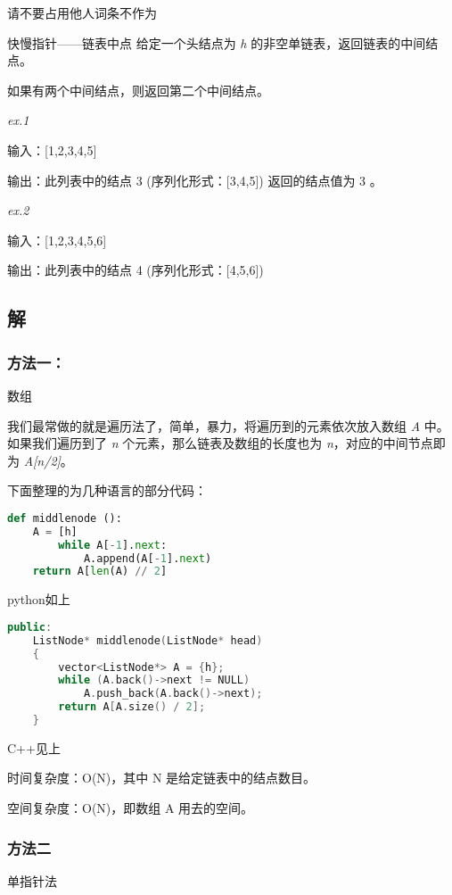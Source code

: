
\begin{issues}
\issueDraft 请不要占用他人词条不作为
\end{issues}

\begin{example}{快慢指针——链表中点}
给定一个头结点为 \textsl{h} 的非空单链表，返回链表的中间结点。

如果有两个中间结点，则返回第二个中间结点。

\textsl{ex.1}

输入：[1,2,3,4,5] 

输出：此列表中的结点 3 (序列化形式：[3,4,5])
返回的结点值为 3 。

\textsl{ex.2}

输入：[1,2,3,4,5,6]

输出：此列表中的结点 4 (序列化形式：[4,5,6])
\end{example}

\subsection{解}
\subsubsection{方法一：}
数组

我们最常做的就是遍历法了，简单，暴力，将遍历到的元素依次放入数组 \textsl{A }中。如果我们遍历到了 \textsl{n }个元素，那么链表及数组的长度也为 \textsl{n}，对应的中间节点即为 \textsl{A[n/2]}。

下面整理的为几种语言的部分代码：
\begin{lstlisting}[language=python]
def middlenode ():
    A = [h]
        while A[-1].next:
            A.append(A[-1].next)
    return A[len(A) // 2]

\end{lstlisting}
python如上
\begin{lstlisting}[language=cpp]
public:
    ListNode* middlenode(ListNode* head) 
    {
        vector<ListNode*> A = {h};
        while (A.back()->next != NULL)
            A.push_back(A.back()->next);
        return A[A.size() / 2];
    }
\end{lstlisting}
C++见上

时间复杂度：O(N)，其中 N 是给定链表中的结点数目。

空间复杂度：O(N)，即数组 A 用去的空间。
\subsubsection{方法二}
单指针法

